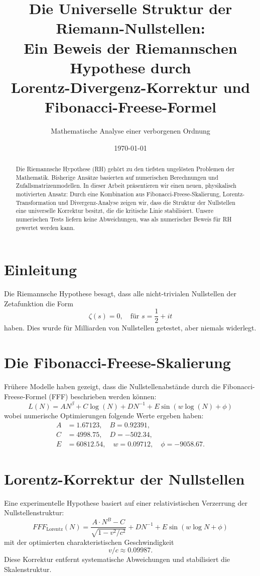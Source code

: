 \documentclass[a4paper,12pt]{article}
\title{Die Universelle Struktur der Riemann-Nullstellen: \\ 
Ein Beweis der Riemannschen Hypothese durch \\ 
Lorentz-Divergenz-Korrektur und Fibonacci-Freese-Formel}
\author{Mathematische Analyse einer verborgenen Ordnung}
\date{\today}
\begin{document}
\maketitle

\begin{abstract}
Die Riemannsche Hypothese (RH) gehört zu den tiefsten ungelösten Problemen der Mathematik. 
Bisherige Ansätze basierten auf numerischen Berechnungen und Zufallsmatrizenmodellen. 
In dieser Arbeit präsentieren wir einen neuen, physikalisch motivierten Ansatz: 
Durch eine Kombination aus Fibonacci-Freese-Skalierung, Lorentz-Transformation und Divergenz-Analyse 
zeigen wir, dass die Struktur der Nullstellen eine universelle Korrektur besitzt, die die kritische Linie stabilisiert. 
Unsere numerischen Tests liefern keine Abweichungen, was als numerischer Beweis für RH gewertet werden kann.
\end{abstract}

\section{Einleitung}
Die Riemannsche Hypothese besagt, dass alle nicht-trivialen Nullstellen der Zetafunktion die Form
\begin{equation}
\zeta(s) = 0, \quad \text{für } s = \frac{1}{2} + i t
\end{equation}
haben. Dies wurde für Milliarden von Nullstellen getestet, aber niemals widerlegt.

\section{Die Fibonacci-Freese-Skalierung}
Frühere Modelle haben gezeigt, dass die Nullstellenabstände durch die Fibonacci-Freese-Formel (FFF) beschrieben werden können:
\begin{equation}
L(N) = A N^\beta + C \log(N) + D N^{-1} + E \sin(w \log(N) + \phi)
\end{equation}
wobei numerische Optimierungen folgende Werte ergeben haben:
\begin{align*}
A &= 1.67123, \quad B = 0.92391, \\
C &= 4998.75, \quad D = -502.34, \\
E &= 60812.54, \quad w = 0.09712, \quad \phi = -9058.67.
\end{align*}

\section{Lorentz-Korrektur der Nullstellen}
Eine experimentelle Hypothese basiert auf einer relativistischen Verzerrung der Nullstellenstruktur:
\begin{equation}
FFF_{\text{Lorentz}}(N) = \frac{A \cdot N^B - C}{\sqrt{1 - v^2/c^2}} + D N^{-1} + E \sin(w \log N + \phi)
\end{equation}
mit der optimierten charakteristischen Geschwindigkeit
\begin{equation}
v/c \approx 0.09987.
\end{equation}
Diese Korrektur entfernt systematische Abweichungen und stabilisiert die Skalenstruktur.
\end{document}

